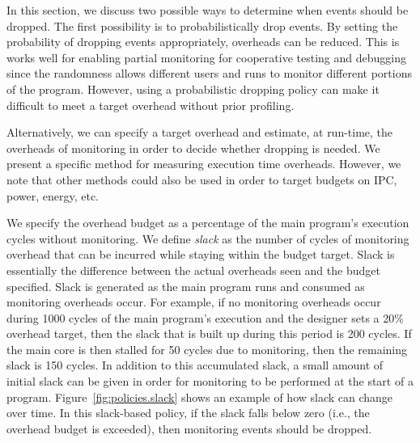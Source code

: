 In this section, we discuss two possible ways to determine when events should be dropped.
The first possibility is to probabilistically drop events. By setting the probability of
dropping events appropriately, overheads can be reduced. This is works well for
enabling partial monitoring for cooperative testing and debugging since the
randomness allows different users and runs to monitor different portions of the
program. However, using a probabilistic dropping policy can make it difficult
to meet a target overhead without prior profiling.

Alternatively, we can specify a target overhead and estimate, at run-time, the
overheads of monitoring in order to decide whether dropping is needed.
We present a specific method
for measuring execution time overheads. However, we note that other methods
could also be used in order to target budgets on IPC, power, energy, etc.  

We specify the overhead budget as a percentage of the main program's execution
cycles without monitoring. We define \emph{slack} as the number of cycles of
monitoring overhead that can be incurred while staying within the budget
target. Slack is essentially the difference between the actual overheads seen
and the budget specified. Slack is generated as the main program runs and consumed as monitoring overheads occur.  For
example, if no monitoring overheads occur during 1000 cycles of the main
program's execution and the designer sets a 20\% overhead target, then the
slack that is built up during this period is 200 cycles. If the main core is
then stalled for 50 cycles due to monitoring, then the remaining slack is 150
cycles. 
In addition to this accumulated slack, a small amount of initial slack
can be given in order for monitoring to be performed at the start of a program.
Figure~\ref{fig:policies.slack} shows an example of how slack can change over time.
In this slack-based policy, if the slack falls below zero (i.e., the overhead budget is exceeded), then
monitoring events should be dropped.

